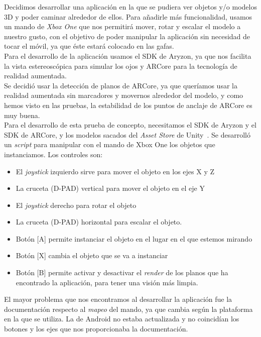Decidimos desarrollar una aplicación en la que se pudiera ver objetos y/o modelos 3D y poder caminar alrededor de ellos. Para añadirle más funcionalidad, usamos un mando de \textit{Xbox One} que nos permitirá mover, rotar y escalar el modelo a nuestro gusto, con el objetivo de poder manipular la aplicación sin necesidad de tocar el móvil, ya que éste estará colocado en las gafas.\\

Para el desarrollo de la aplicación usamos el SDK de Aryzon, ya que nos facilita la vista estereoscópica para simular los ojos y ARCore para la tecnología de realidad aumentada.\\

Se decidió usar la detección de planos de ARCore, ya que queríamos usar la realidad aumentada sin marcadores y movernos alrededor del modelo, y como hemos visto en las pruebas, la estabilidad de los puntos de anclaje de ARCore es muy buena.\\

Para el desarrollo de esta prueba de concepto, necesitamos el SDK de Aryzon y el SDK de ARCore, y los modelos sacados del \textit{Asset Store} de Unity~\cite{AssetStore}. Se desarrolló un \textit{script} para manipular con el mando de Xbox One los objetos que instanciamos. Los controles son:
\begin{itemize}
    \item El \textit{joystick} izquierdo sirve para mover el objeto en los ejes X y Z
    \item La cruceta (D-PAD) vertical para mover el objeto en el eje Y
    \item El \textit{joystick} derecho para rotar el objeto
    \item La cruceta (D-PAD) horizontal para escalar el objeto.
    \item Botón [A] permite instanciar el objeto en el lugar en el que estemos mirando
    \item Botón [X] cambia el objeto que se va a instanciar
    \item Botón [B] permite activar y desactivar el \textit{render} de los planos que ha encontrado la aplicación, para tener una visión más limpia.

\end{itemize}


El mayor problema que nos encontramos al desarrollar la aplicación fue la documentación respecto al \textit{mapeo} del mando, ya que cambia según la plataforma en la que se utiliza. La de Android no estaba actualizada y no coincidían los botones y los ejes que nos proporcionaba la documentación.\\

